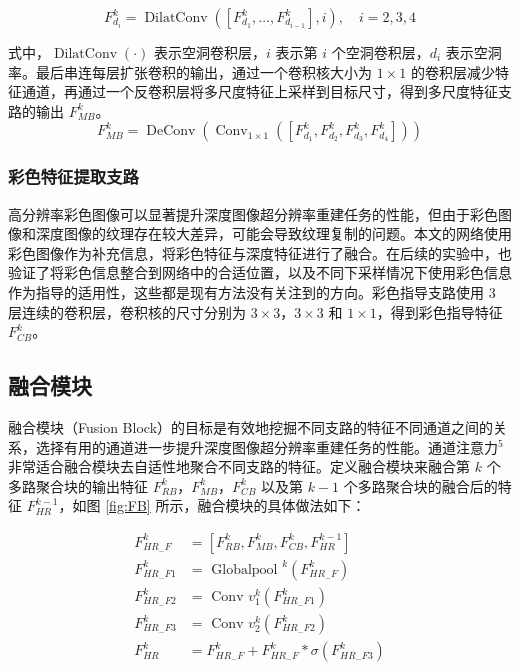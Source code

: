 \documentclass[14px]{article}
\begin{document}
\begin{equation}
F_{d_{i}}^{k}=\operatorname{DilatConv}\left(\left[F_{d_{1}}^{k}, \ldots, F_{d_{i-1}}^{k}\right], i\right), \quad i=2,3,4
\end{equation}

式中，$\operatorname{DilatConv}(\cdot)$ 表示空洞卷积层，$i$ 表示第 $i$ 个空洞卷积层，$d_i$ 表示空洞率。最后串连每层扩张卷积的输出，通过一个卷积核大小为 $1\times 1$ 的卷积层减少特征通道，再通过一个反卷积层将多尺度特征上采样到目标尺寸，得到多尺度特征支路的输出 $F_{M B}^{k}$。
\begin{equation}
F_{M B}^{k}=\operatorname{DeConv}\left(\operatorname{Conv}_{1 \times 1}\left(\left[F_{d_{1}}^{k}, F_{d_{2}}^{k}, F_{d_{3}}^{k}, F_{d_{4}}^{k}\right]\right)\right)
\end{equation}

\subsubsection{彩色特征提取支路}

高分辨率彩色图像可以显著提升深度图像超分辨率重建任务的性能，但由于彩色图像和深度图像的纹理存在较大差异，可能会导致纹理复制的问题。本文的网络使用彩色图像作为补充信息，将彩色特征与深度特征进行了融合。在后续的实验中，也验证了将彩色信息整合到网络中的合适位置，以及不同下采样情况下使用彩色信息作为指导的适用性，这些都是现有方法没有关注到的方向。彩色指导支路使用 3 层连续的卷积层，卷积核的尺寸分别为 $3\times 3$，$3\times 3$ 和 $1\times 1$，得到彩色指导特征 $F_{CB}^k$。



\subsection{融合模块}
融合模块（Fusion Block）的目标是有效地挖掘不同支路的特征不同通道之间的关系，选择有用的通道进一步提升深度图像超分辨率重建任务的性能。通道注意力$^5$非常适合融合模块去自适性地聚合不同支路的特征。定义融合模块来融合第 $k$ 个多路聚合块的输出特征 $F_{RB}^k$，$F_{MB}^k$，$F_{CB}^k$ 以及第 $k-1$ 个多路聚合块的融合后的特征 $F_{HR}^{k-1}$，如图 \ref{fig:FB} 所示，融合模块的具体做法如下：

\begin{equation}
\begin{aligned}
F_{H R_{-} F}^{k} &=\left[F_{R B}^{k}, F_{M B}^{k}, F_{C B}^{k}, F_{H R}^{k-1}\right] \\
F_{H R_{-} F 1}^{k} &=\text { Globalpool }^{k}\left(F_{H R_{-} F}^{k}\right) \\
F_{H R_{-} F 2}^{k} &=\text { Conv } v_{1}^{k}\left(F_{H R_{-} F 1}^{k}\right) \\
F_{H R_{-} F 3}^{k} &=\text { Conv } v_{2}^{k}\left(F_{H R_{-} F 2}^{k}\right) \\
F_{H R}^{k} &=F_{H R_{-} F}^{k}+F_{H R_{-} F}^{k} * \sigma\left(F_{H R_{-} F 3}^{k}\right)
\end{aligned}
\end{equation}
\end{document}

